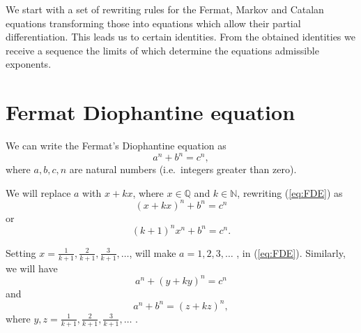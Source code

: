 \documentclass[11pt]{article}
\begin{document}
We start with a set of rewriting rules for the Fermat, Markov and Catalan equations
transforming those into equations which allow their partial differentiation.
This leads us to certain identities. From the obtained identities we
receive a sequence the limits of which determine the equations admissible exponents.


\section{Fermat Diophantine equation}

We can write the Fermat's Diophantine equation \cite{Edwards1978FLT, Vandiver1929FLT, Vandiver1946FLT, Dickson1917FLT} as
\begin{equation}
\label{eq:FDE}
a^{n} + b^{n} = c^{n},
\end{equation}
where $a, b, c, n$ are natural numbers (i.e.~integers greater than zero).


We will replace $a$ with $x + kx$, where $x \in \mathbb{Q}$ and $k \in \mathbb{N}$, rewriting (\ref{eq:FDE}) as
\begin{equation}
\label{eq:FDE_rewritten}
(x + kx)^{n} + b^{n} = c^{n}
\end{equation}
or
\begin{equation}
\label{eq:FDE_rewritten_x}
(k + 1)^{n} x^{n} + b^{n} = c^{n}.
\end{equation}

Setting $x = \frac{1}{k+1}, \frac{2}{k+1}, \frac{3}{k+1}, \ldots$,
will make $a = 1, 2, 3, \ldots$ , in (\ref{eq:FDE}).
Similarly, we will have
\begin{equation}
\label{eq:FDE_rewritten_Y}
a^{n} + (y + ky)^{n} = c^{n}
\end{equation}
and
\begin{equation}
\label{eq:FDE_rewritten_Z}
a^{n} + b^{n} = (z + kz)^{n},
\end{equation}
where $y, z = \frac{1}{k+1}, \frac{2}{k+1}, \frac{3}{k+1}, \ldots$ \@.

\end{document}
